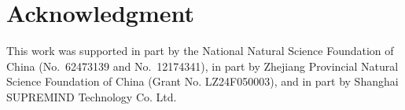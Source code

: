 \section*{Acknowledgment}
\label{sec:Acknowledgment}
This work was supported in part by the National Natural Science Foundation of China (No.~62473139 and No.~12174341), in part by Zhejiang Provincial Natural Science Foundation of China (Grant No. LZ24F050003), and in part by Shanghai SUPREMIND Technology Co. Ltd.
